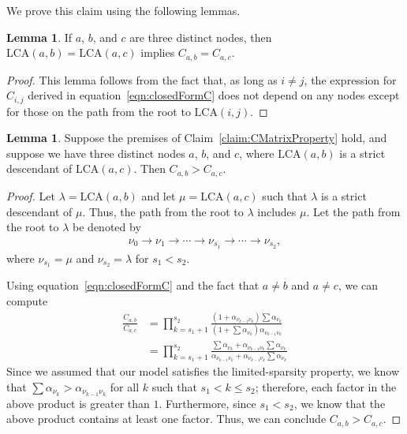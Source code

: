 \documentclass{article}
\theoremstyle{definition}
\newtheorem{lemma}[thm]{Lemma}
\begin{document}
We prove this claim using the following lemmas.

\begin{lemma}
If $a$, $b$, and $c$ are three distinct nodes, then $\text{LCA}(a,b) = \text{LCA}(a,c)$ implies $C_{a,b} = C_{a,c}$.
\label{lemma:equalLCA}
\end{lemma}

\begin{proof}
This lemma follows from the fact that, as long as $i \neq j$, the expression for $C_{i,j}$ derived in equation~\eqref{eqn:closedFormC} does not depend on any nodes except for those on the path from the root to $\text{LCA}(i,j)$.
\end{proof}

\begin{lemma}
Suppose the premises of Claim~\ref{claim:CMatrixProperty} hold, and suppose we have three distinct nodes $a$, $b$, and $c$, where $\text{LCA}(a,b)$ is a strict descendant of $\text{LCA}(a,c)$.
Then $C_{a,b} > C_{a,c}$.
\label{lemma:greaterLCA}
\end{lemma}

\begin{proof}
Let $\lambda = \text{LCA}(a,b)$ and let $\mu = \text{LCA}(a,c)$ such that $\lambda$ is a strict descendant of $\mu$.
Thus, the path from the root to $\lambda$ includes $\mu$.
Let the path from the root to $\lambda$ be denoted by
\begin{align}
\nu_0 \to \nu_1 \to \cdots \to \nu_{s_1} \to \cdots \to \nu_{s_2},
\end{align}
where $\nu_{s_1} = \mu$ and $\nu_{s_2} = \lambda$ for $s_1 < s_2$.

Using equation~\eqref{eqn:closedFormC} and the fact that $a \neq b$ and $a \neq c$, we can compute
\begin{align}
\frac{C_{a,b}}{C_{a,c}}
&=
\prod_{k=s_1+1}^{s_2}
\frac
  { \left( 1 + \alpha_{\nu_{k-1} \nu_k} \right) \sum \alpha_{\nu_k} }
  { \left( 1 + \sum \alpha_{\nu_k} \right) \alpha_{\nu_{k-1} \nu_k} }
\\
&=
\prod_{k=s_1+1}^{s_2}
\frac
  { \sum \alpha_{\nu_k} + \alpha_{\nu_{k-1} \nu_k} \sum \alpha_{\nu_k} }
  { \alpha_{\nu_{k-1} \nu_k} + \alpha_{\nu_{k-1} \nu_k} \sum \alpha_{\nu_k} }
\end{align}
%
Since we assumed that our model satisfies the limited-sparsity property, we know that $\sum \alpha_{\nu_k} > \alpha_{\nu_{k-1} \nu_k}$ for all $k$ such that $s_1 < k \leq s_2$; therefore, each factor in the above product is greater than $1$.
Furthermore, since $s_1 < s_2$, we know that the above product contains at least one factor.
Thus, we can conclude $C_{a,b} > C_{a,c}$.
\end{proof}
\end{document}
